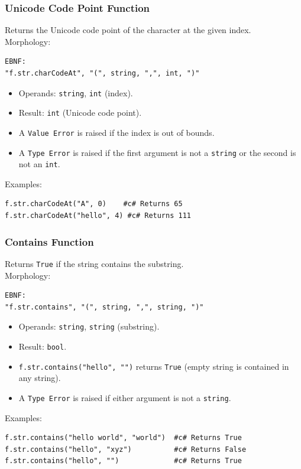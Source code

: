 \subsubsection{Unicode Code Point Function}
Returns the Unicode code point of the character at the given index. \\
Morphology:
\begin{verbatim}
EBNF:
"f.str.charCodeAt", "(", string, ",", int, ")"
\end{verbatim}
\begin{itemize}
\item Operands: \texttt{string}, \texttt{int} (index).
\item Result: \texttt{int} (Unicode code point).
\item A \texttt{Value Error} is raised if the index is out of bounds.
\item A \texttt{Type Error} is raised if the first argument is not a \texttt{string} or the second is not an \texttt{int}.
\end{itemize}
Examples:
\begin{verbatim}
f.str.charCodeAt("A", 0)    #c# Returns 65
f.str.charCodeAt("hello", 4) #c# Returns 111
\end{verbatim}

\subsubsection{Contains Function}
Returns \texttt{True} if the string contains the substring. \\
Morphology:
\begin{verbatim}
EBNF:
"f.str.contains", "(", string, ",", string, ")"
\end{verbatim}
\begin{itemize}
\item Operands: \texttt{string}, \texttt{string} (substring).
\item Result: \texttt{bool}.
\item \texttt{f.str.contains("hello", "")} returns \texttt{True} (empty string is contained in any string).
\item A \texttt{Type Error} is raised if either argument is not a \texttt{string}.
\end{itemize}
Examples:
\begin{verbatim}
f.str.contains("hello world", "world")  #c# Returns True
f.str.contains("hello", "xyz")          #c# Returns False
f.str.contains("hello", "")             #c# Returns True
\end{verbatim}

